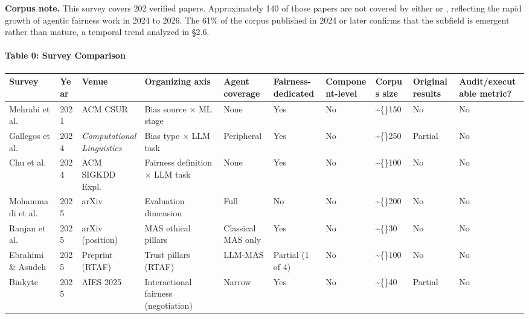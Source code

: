 \documentclass[10pt]{article}
\begin{document}
\textbf{Corpus note.} This survey covers 202 verified papers. Approximately 140 of those papers are not covered by either \cite{gallegos2024bias} or \cite{chu2024fairness}, reflecting the rapid growth of agentic fairness work in 2024 to 2026. The 61\% of the corpus published in 2024 or later confirms that the subfield is emergent rather than mature, a temporal trend analyzed in \S{}2.6.


\paragraph*{Table 0: Survey Comparison}

\begin{center}\footnotesize
\begin{longtable}{|p{}|p{}|p{}|p{}|p{}|p{}|p{}|p{}|p{}|p{}|}
\hline \textbf{Survey} & \textbf{Year} & \textbf{Venue} & \textbf{Organizing axis} & \textbf{Agent coverage} & \textbf{Fairness-dedicated} & \textbf{Component-level} & \textbf{Corpus size} & \textbf{Original results} & \textbf{Audit/executable metric?} \\ \hline\endhead
Mehrabi et al. \cite{mehrabi2021survey} & 2021 & ACM CSUR & Bias source $\times$ ML stage & None & Yes & No & \textasciitilde\{\}150 & No & No \\ \hline
Gallegos et al. \cite{gallegos2024bias} & 2024 & \emph{Computational Linguistics} & Bias type $\times$ LLM task & Peripheral & Yes & No & \textasciitilde\{\}250 & Partial & No \\ \hline
Chu et al. \cite{chu2024fairness} & 2024 & ACM SIGKDD Expl. & Fairness definition $\times$ LLM task & None & Yes & No & \textasciitilde\{\}100 & No & No \\ \hline
Mohammadi et al. \cite{mohammadi2025evaluation} & 2025 & arXiv & Evaluation dimension & Full & No & No & \textasciitilde\{\}200 & No & No \\ \hline
Ranjan et al. \cite{ranjan2025fairness} & 2025 & arXiv (position) & MAS ethical pillars & Classical MAS only & Yes & No & \textasciitilde\{\}30 & No & No \\ \hline
Ebrahimi \& Asudeh \cite{ebrahimi2025survey} & 2025 & Preprint (RTAF) & Trust pillars (RTAF) & LLM-MAS & Partial (1 of 4) & No & \textasciitilde\{\}100 & No & No \\ \hline
Binkyte \cite{binkyte2025interactional} & 2025 & AIES 2025 & Interactional fairness (negotiation) & Narrow & Yes & No & \textasciitilde\{\}40 & Partial & No \\ \hline

\end{longtable}
\end{center}
\end{document}
